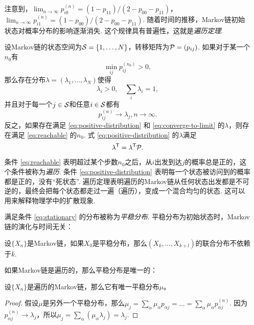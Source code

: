注意到，$\lim_{n\to\infty}p_{i0}^{(n)}=(1-p_{11})/(2-p_{00}-p_{11})$，$\lim_{n\to\infty}p_{i1}^{(n)}=(1-p_{00})/(2-p_{00}-p_{11})$. 随着时间的推移，Markov链初始状态对概率分布的影响逐渐消失. 这个规律具有普遍性，这就是\emph{遍历定理}.


\begin{theorem}[遍历定理]\label{thm:ergodic-theorem}
    设Markov链的状态空间为$\MS=\{1,\dots,N\}$，转移矩阵为$\P=(p_{ij})$. 如果对于某一个$n_0$有
    \begin{equation}
        \min_{ij}p_{ij}^{(n_0)}>0,\label{eq:reachable}
    \end{equation}
    那么存在分布$\lambda=(\lambda_1,\dots,\lambda_N)$使得
    \begin{equation}
        \lambda_i>0,\quad\sum_i\lambda_i=1,\label{eq:positive-distribution}
    \end{equation}
    并且对于每一个$j\in\MS$和任意$i\in\MS$都有
    \begin{equation}
    p_{ij}^{(n)}\to\lambda_j,n\to\infty.\label{eq:converge-to-limit}
    \end{equation}
    反之，如果存在满足 \eqref{eq:positive-distribution} 和 \eqref{eq:converge-to-limit} 的$\lambda$，则存在满足 \eqref{eq:reachable} 的$n_0$.
    式 \eqref{eq:positive-distribution} 的$\lambda$满足
    \begin{equation}
        \lambda^\t = \lambda^\t\P.\label{eq:stationary}
    \end{equation}
\end{theorem}

条件 \eqref{eq:reachable} 表明超过某个步数$n_0$之后，从$i$出发到达$j$的概率总是正的，这个条件被称为\emph{遍历}. 条件 \eqref{eq:positive-distribution} 表明每一个状态被访问到的概率都是正的，没有``死状态''. 遍历定理表明遍历的Markov链从任何状态出发都是不可逆的，最终会把每个状态都走过一遍（遍历），变成一个混合均匀的状态. 这可以用来解释物理学中的扩散现象. %

满足条件 \eqref{eq:stationary} 的分布被称为\emph{平稳分布}. 平稳分布为初始状态时，Markov链的演化与时间无关：
\begin{proposition}\label{prop:stationary-distribution}
设$\{X_n\}$是Markov链，如果$X_0$是平稳分布，那么$(X_k,\dots,X_{k+l})$的联合分布不依赖于$k$.
\end{proposition}

如果Markov链是遍历的，那么平稳分布是唯一的：
\begin{proposition}\label{prop:unique-stationary-distribution}
设$\{X_n\}$是遍历的Markov链，那么它有唯一平稳分布$\mu$。
\end{proposition}
    \begin{proof}
        假设$\mu$是另外一个平稳分布，那么$\mu_j=\sum_\alpha\mu_\alpha p_{\alpha j}=\dots=\sum_{\alpha}\mu_\alpha p_{\alpha j}^{(n)}$. 因为$p_{\alpha j}^{(n)}\to \lambda_j$，所以$\mu_j=\sum_{\alpha} (\mu_\alpha\lambda_j)=\lambda_j$.
    \end{proof}

